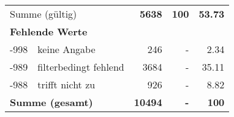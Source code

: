 \begin{longtable}{lXrrr}
     \midrule
     \multicolumn{2}{l}{Summe (gültig)} &
       \textbf{\num{5638}} &
     \textbf{\num{100}} &
       \textbf{\num[round-mode=places,round-precision=2]{53.73}} \\
     \multicolumn{5}{l}{\textbf{Fehlende Werte}}\\
       -998 &
       keine Angabe &
         \num{246} &
        - &
         \num[round-mode=places,round-precision=2]{2.34} \\
       -989 &
       filterbedingt fehlend &
         \num{3684} &
        - &
         \num[round-mode=places,round-precision=2]{35.11} \\
       -988 &
       trifft nicht zu &
         \num{926} &
        - &
         \num[round-mode=places,round-precision=2]{8.82} \\
     \midrule
     \multicolumn{2}{l}{\textbf{Summe (gesamt)}} &
          \textbf{\num{10494}} &
        \textbf{-} &
        \textbf{\num{100}} \\
     \bottomrule
     \end{longtable}
     

